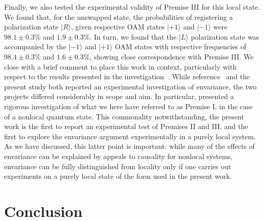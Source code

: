 \documentclass[12pt]{iopart}
\begin{document}
Finally, we also tested the experimental validity of Premise III for this local state. We found that, for the unswapped state, the probabilities of registering a polarization state $|R\rangle$, given respective OAM states $|+1\rangle$ and $|-1\rangle$ were $98.1\pm0.3\%$ and $1.9\pm0.3\%$. In turn, we found that the $|L\rangle$ polarization state was accompanied by the $|-1\rangle$ and $|+1\rangle$ OAM states with respective frequencies of $98.4\pm0.3\%$ and $1.6\pm0.3\%$, showing close correspondence with Premise III. {We close with a brief comment to place this work in context, particularly with respect to the results presented in the investigation~\cite{vermeyden:15}. While reference~\cite{vermeyden:15} and the present study both reported an experimental investigation of envariance, the two projects differed considerably in scope and aim. In particular, \cite{vermeyden:15} presented a rigorous investigation of what we here have referred to as Premise I, in the case of a nonlocal quantum state. This commonality notwithstanding, the present work is the first to report an experimental test of Premises II and III, and the first to explore the envariance argument experimentally in a purely local system. As we have discussed, this latter point is important: while many of the effects of envariance can be explained by appeals to causality for nonlocal systems, envariance can be fully distinguished from locality only if one carries out experiments on a purely local state of the form used in the present work.}

\section{Conclusion}
\end{document}
